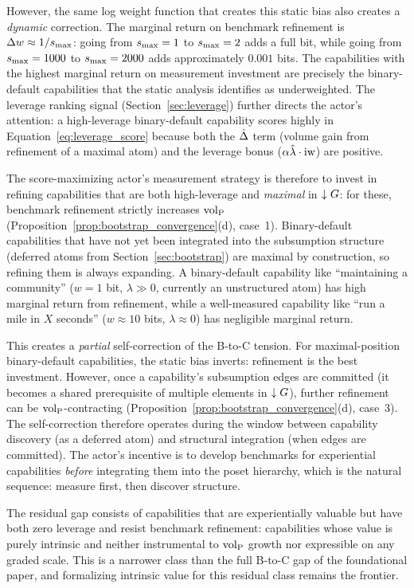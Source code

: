 However, the same log weight function that creates this static bias also
creates a \emph{dynamic} correction. The marginal return on benchmark
refinement is $\Delta w \approx 1/s_{\mathrm{max}}$: going from $s_{\mathrm{max}} = 1$ to $s_{\mathrm{max}} =
2$ adds a full bit, while going from $s_{\mathrm{max}} = 1000$ to $s_{\mathrm{max}} = 2000$ adds
approximately $0.001$ bits. The capabilities with the highest marginal return
on measurement investment are precisely the binary-default capabilities that
the static analysis identifies as underweighted. The leverage ranking signal
(Section~\ref{sec:leverage}) further directs the actor's attention: a
high-leverage binary-default capability scores highly in
Equation~\eqref{eq:leverage_score} because both the $\hat{\Delta}$ term (volume
gain from refinement of a maximal atom) and the leverage bonus ($\alpha
\hat{\lambda} \cdot \operatorname{iw}$) are positive.

The score-maximizing actor's measurement strategy is therefore to invest in
refining capabilities that are both high-leverage and \emph{maximal} in
$\downarrow G$: for these, benchmark refinement strictly increases ${\operatorname{vol}_{\mathrm{P}}}$
(Proposition~\ref{prop:bootstrap_convergence}(d), case~1). Binary-default
capabilities that have not yet been integrated into the subsumption structure
(deferred atoms from Section~\ref{sec:bootstrap}) are maximal by construction,
so refining them is always expanding. A binary-default capability like
``maintaining a community'' ($w = 1$ bit, $\lambda \gg 0$, currently an
unstructured atom) has high marginal return from refinement, while a
well-measured capability like ``run a mile in $X$ seconds'' ($w \approx 10$
bits, $\lambda \approx 0$) has negligible marginal return.

This creates a \emph{partial} self-correction of the B-to-C tension. For
maximal-position binary-default capabilities, the static bias inverts:
refinement is the best investment. However, once a capability's subsumption
edges are committed (it becomes a shared prerequisite of multiple elements in
$\downarrow G$), further refinement can be ${\operatorname{vol}_{\mathrm{P}}}$-contracting
(Proposition~\ref{prop:bootstrap_convergence}(d), case~3). The self-correction
therefore operates during the window between capability discovery (as a
deferred atom) and structural integration (when edges are committed). The
actor's incentive is to develop benchmarks for experiential capabilities
\emph{before} integrating them into the poset hierarchy, which is the
natural sequence: measure first, then discover structure.

The residual gap consists of capabilities that are experientially valuable but
have both zero leverage and resist benchmark refinement: capabilities whose
value is purely intrinsic and neither instrumental to ${\operatorname{vol}_{\mathrm{P}}}$ growth nor
expressible on any graded scale. This is a narrower class than the full B-to-C
gap of the foundational paper, and formalizing intrinsic value for this
residual class remains the frontier.

